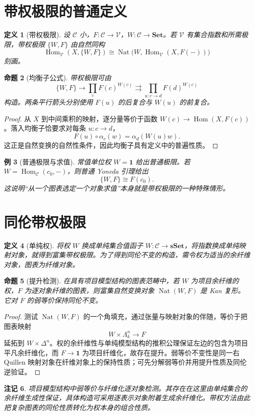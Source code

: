 \documentclass[12pt,oneside,openany,fontset=none]{ctexbook}
\theoremstyle{cn}
\newtheorem{definition}{定义}[chapter]
\newtheorem{example}[definition]{例}
\newtheorem{proposition}[definition]{命题}
\newtheorem{remark}[definition]{注记}
\numberwithin{equation}{chapter}
\newcommand{\Set}{\mathbf{Set}}
\newcommand{\sSet}{\mathbf{sSet}}
\newcommand{\Hom}{\operatorname{Hom}}
\newcommand{\Nat}{\operatorname{Nat}}
\newcommand{\one}{\mathbf 1}
\begin{document}
\section{带权极限的普通定义}
\begin{definition}[带权极限]
设 $\mathcal C$ 小，$F:\mathcal C\to\mathcal V$，$W:\mathcal C\to\Set$。若 $\mathcal V$ 有集合指数和所需极限，带权极限 $\{W,F\}$ 由自然同构
\[
\Hom_{\mathcal V}(X,\{W,F\})
\cong\Nat\bigl(W,\Hom_{\mathcal V}(X,F(-))\bigr)
\]
刻画。
\end{definition}
\begin{proposition}[均衡子公式]
带权极限可由
\[
\{W,F\}\longrightarrow\prod_cF(c)^{W(c)}
\rightrightarrows\prod_{u:c\to d}F(d)^{W(c)}
\]
构造。两条平行箭头分别使用 $F(u)$ 的后复合与 $W(u)$ 的前复合。
\end{proposition}
\begin{proof}
从 $X$ 到中间乘积的映射，逐分量等价于函数
$W(c)\to\Hom(X,F(c))$。落入均衡子恰要求对每条 $u:c\to d$，
\[
F(u)\circ\alpha_c(w)=\alpha_d(W(u)w).
\]
这正是自然变换的自然性条件，因此均衡子具有定义中的普遍性质。
\end{proof}
\begin{example}[普通极限与求值]
常值单位权 $W=\one$ 给出普通极限。若 $W=\Hom_{\mathcal C}(c_0,-)$，则普通 Yoneda 引理给出
\[
\{W,F\}\cong F(c_0).
\]
这说明“从一个图表选定一个对象求值”本身就是带权极限的一种特殊情形。
\end{example}

\section{同伦带权极限}
\begin{definition}[单纯权]
将权 $W$ 换成单纯集合值函子 $W:\mathcal C\to\sSet$，将指数换成单纯映射对象，就得到富集带权极限。为了得到同伦不变的构造，需令权为适当的余纤维对象，图表为纤维对象。
\end{definition}
\begin{proposition}[提升检测]
在具有项目模型结构的图表范畴中，若 $W$ 为项目余纤维的权，$F$ 为逐对象纤维的图表，则富集自然变换对象 $\Nat(W,F)$ 是 Kan 复形。它对 $F$ 的弱等价保持同伦不变。
\end{proposition}
\begin{proof}
测试 $\Nat(W,F)$ 的一个角填充，通过张量与映射对象的伴随，等价于把图表映射
\[
W\times\Lambda_k^n\longrightarrow F
\]
延拓到 $W\times\Delta^n$。权的余纤维性与单纯模型结构的推积公理保证左边的包含为项目平凡余纤维化，而 $F\to\one$ 为项目纤维化，故存在提升。弱等价不变性是同一右 Quillen 映射对象在纤维对象上的保持性质；可先分解弱等价并用提升性质及同伦逆验证。
\end{proof}
\begin{remark}
项目模型结构中弱等价与纤维化逐对象检测。其存在在这里由单纯集合的余纤维生成性保证，具体构造可采用逐表示对象附着生成余纤维化。带权方法由此把复杂图表的同伦性质转化为权本身的组合性质。
\end{remark}
\end{document}
